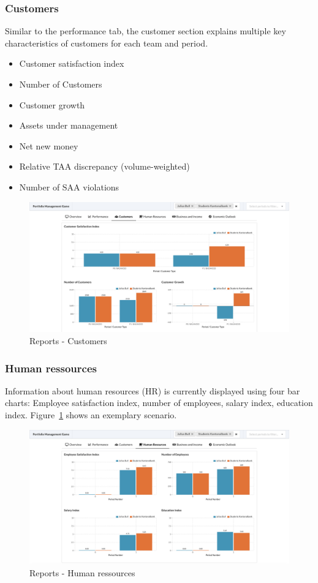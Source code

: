 \subsubsection{Customers}
Similar to the performance tab, the customer section explains multiple key characteristics of customers for each team and period.
\begin{itemize}
  \setlength\itemsep{0.01em}
  \item Customer satisfaction index
  \item Number of Customers
  \item Customer growth
  \item Assets under management
  \item Net new money
  \item Relative TAA discrepancy (volume-weighted)
  \item Number of SAA violations
\end{itemize}
\begin{figure}[h!]
  \centering
  \includegraphics[scale=0.2]{img/application-overview/reports/03_customers.png}
  \caption{Reports - Customers}
\end{figure}

\subsubsection{Human ressources}
Information about human resources (HR) is currently displayed using four bar charts: Employee satisfaction index, number of employees, salary index, education index. Figure~\ref{fig:reports_hr} shows an exemplary scenario.
\begin{figure}[h!]
  \centering
  \includegraphics[scale=0.2]{img/application-overview/reports/04_hr.png}
  \caption{Reports - Human ressources}
  \label{fig:reports_hr}
\end{figure}

